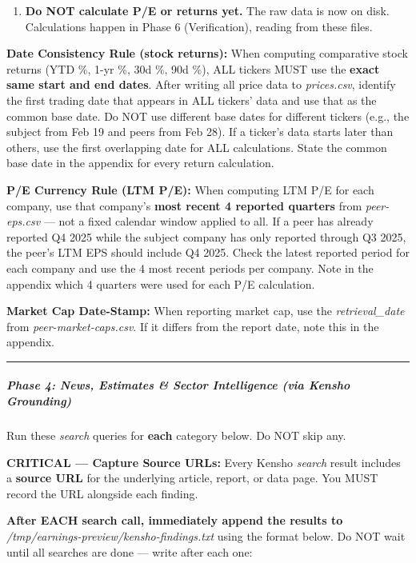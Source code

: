 \documentclass[11pt]{article}
\begin{document}
\begin{enumerate}[leftmargin=*,itemsep=2pt,topsep=2pt]
\item {} \textbf{Do NOT calculate P/E or returns yet.} The raw data is now on disk. Calculations happen in Phase 6 (Verification), reading from these files.
\end{enumerate}

\textbf{Date Consistency Rule (stock returns):} When computing comparative stock returns (YTD \%, 1-yr \%, 30d \%, 90d \%), ALL tickers MUST use the \textbf{exact same start and end dates}. After writing all price data to \emph{prices.csv}, identify the first trading date that appears in ALL tickers' data and use that as the common base date. Do NOT use different base dates for different tickers (e.g., the subject from Feb 19 and peers from Feb 28). If a ticker's data starts later than others, use the first overlapping date for ALL calculations. State the common base date in the appendix for every return calculation.


\textbf{P/E Currency Rule (LTM P/E):} When computing LTM P/E for each company, use that company's \textbf{most recent 4 reported quarters} from \emph{peer-eps.csv} — not a fixed calendar window applied to all. If a peer has already reported Q4 2025 while the subject company has only reported through Q3 2025, the peer's LTM EPS should include Q4 2025. Check the latest reported period for each company and use the 4 most recent periods per company. Note in the appendix which 4 quarters were used for each P/E calculation.


\textbf{Market Cap Date-Stamp:} When reporting market cap, use the \emph{retrieval\_\allowbreak{}date} from \emph{peer-market-caps.csv}. If it differs from the report date, note this in the appendix.


\vspace{0.5em}\hrule\vspace{0.5em}

\subparagraph{Phase 4: News, Estimates \& Sector Intelligence (via Kensho Grounding)}\mbox{}\par

Run these \emph{search} queries for \textbf{each} category below. Do NOT skip any.


\textbf{CRITICAL — Capture Source URLs:} Every Kensho \emph{search} result includes a \textbf{source URL} for the underlying article, report, or data page. You MUST record the URL alongside each finding.


\textbf{After EACH search call, immediately append the results to} \emph{/tmp/earnings-preview/kensho-findings.txt} using the format below. Do NOT wait until all searches are done — write after each one:
\end{document}
